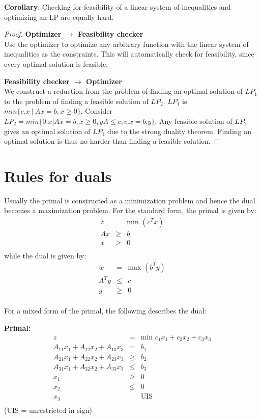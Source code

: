 \documentclass[11pt]{article}
\begin{document}
\textbf{Corollary}:
Checking for feasibility of a linear system of inequalities and optimizing an LP are equally hard.

\begin{proof}
{\bf Optimizer $\rightarrow$ Feasibility checker}\\
Use the optimizer to optimize any arbitrary function with the linear system of inequalities as the constraints. This will automatically check for feasibility, since every optimal solution is feasible.

{\bf Feasibility checker  $\rightarrow$ Optimizer}\\
We construct a reduction from the problem of finding an optimal solution
of $LP_1$ to the problem of finding a feasible solution of $LP_2$.
$LP_1$ is $min \{c.x\ |\ Ax = b, x \geq 0\}$. Consider $LP_2 = 
min\{0.x|Ax = b, x \geq 0, yA \leq c, c.x = b.y\}$. Any feasible solution of $LP_2$
gives an optimal solution of $LP_1$ due to the strong duality theorem. Finding an optimal
solution is thus no harder than finding a feasible solution.  
\end{proof}

\section{Rules for duals}
Usually the primal is constructed as a minimization problem and hence the dual becomes a maximization problem. For the standard form, the primal is given by:
\begin{eqnarray*}
z&=&\mbox{min }(c^Tx)\\
Ax&\geq&b\\
x&\geq&0\\
\end{eqnarray*}
while the dual is given by:
\begin{eqnarray*}
w&=&\mbox{max }(b^Ty)\\
A^Ty&\leq&c\\
y&\geq&0\\
\end{eqnarray*}

For a mixed form of the primal, the following describes the dual:

{\bf Primal:}\\
\begin{eqnarray*}
z&=&\mbox{min }c_1x_1+c_2x_2+c_3x_3\\
A_{11}x_1+A_{12}x_2+A_{13}x_3&=&b_1\\
A_{21}x_1+A_{22}x_2+A_{23}x_3&\geq&b_2\\
A_{31}x_1+A_{32}x_2+A_{33}x_3&\leq&b_3\\
x_1&\geq&0\\
x_2&\leq&0\\
x_3& &\mbox{UIS}\\
\end{eqnarray*}
(UIS = unrestricted in sign)
\end{document}
